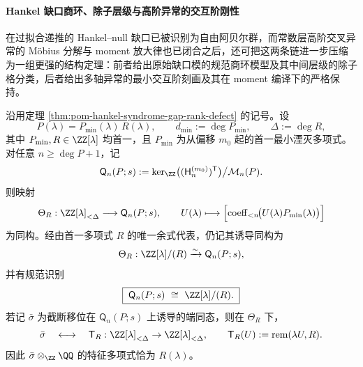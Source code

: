 \paragraph{Hankel 缺口商环、除子层级与高阶异常的交互阶刚性}
在过拟合递推的 Hankel--null 缺口已被识别为自由阿贝尔群，而常数层高阶交叉异常的 Möbius 分解与 moment 放大律也已闭合之后，还可把这两条链进一步压缩为一组更强的结构定理：前者给出原始缺口模的规范商环模型及其中间层级的除子格分类，后者给出多轴异常的最小交互阶刻画及其在 moment 编译下的严格保持。

\begin{theorem}\label{thm:xi-time-part62af-hankel-gap-quotient-ring-model}
沿用定理 \ref{thm:pom-hankel-syndrome-gap-rank-defect} 的记号。设
\[
P(\lambda)=P_{\min}(\lambda)\,R(\lambda),
\qquad
d_{\min}:=\deg P_{\min},
\qquad
\Delta:=\deg R,
\]
其中 \(P_{\min},R\in\ZZ[\lambda]\) 均首一，且 \(P_{\min}\) 为从偏移 \(m_0\) 起的首一最小湮灭多项式。
对任意 \(n\ge \deg P+1\)，记
\[
\mathsf Q_n(P;s)
:=
\ker_{\ZZ}\bigl((\mathsf H^{(m_0)}_n)^{\mathsf T}\bigr)\big/\mathcal M_n(P).
\]
则映射
\[
\Theta_R:\ZZ[\lambda]_{<\Delta}\longrightarrow \mathsf Q_n(P;s),\qquad
U(\lambda)\longmapsto
\Bigl[\operatorname{coeff}_{<n}\!\bigl(U(\lambda)P_{\min}(\lambda)\bigr)\Bigr]
\]
为同构。经由首一多项式 \(R\) 的唯一余式代表，仍记其诱导同构为
\[
\Theta_R:\ZZ[\lambda]/(R)\xrightarrow{\sim}\mathsf Q_n(P;s),
\]
并有规范识别
\[
\boxed{\;
\mathsf Q_n(P;s)\ \cong\ \ZZ[\lambda]/(R).\;}
\]
若记 \(\bar\sigma\) 为截断移位在 \(\mathsf Q_n(P;s)\) 上诱导的端同态，则在 \(\Theta_R\) 下，
\[
\bar\sigma
\quad\longleftrightarrow\quad
\mathsf T_R:\ZZ[\lambda]_{<\Delta}\to \ZZ[\lambda]_{<\Delta},
\qquad
\mathsf T_R(U):=\operatorname{rem}(\lambda U,R).
\]
因此 \(\bar\sigma\otimes_{\ZZ}\QQ\) 的特征多项式恰为 \(R(\lambda)\)。
\end{theorem}
